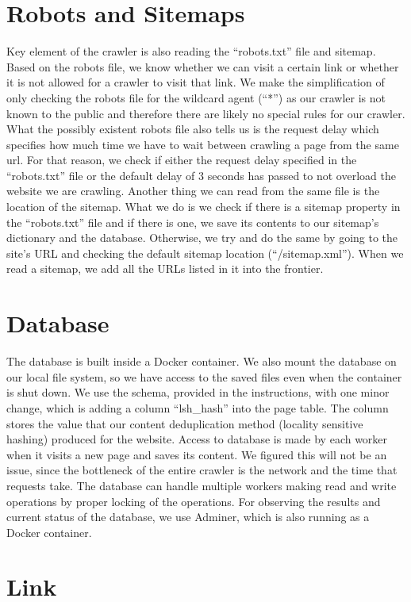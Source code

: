 \documentclass[9pt]{IEEEtran}
\begin{document}
\section{Robots and Sitemaps}\label{sec:robotsSitemaps}
Key element of the crawler is also reading the ``robots.txt'' file and sitemap. 
Based on the robots file, we know whether we can visit a certain link or whether it is not allowed for a crawler to visit that link.
We make the simplification of only checking the robots file for the wildcard agent (``*'') as our crawler is not known to the public and therefore there are likely no special rules for our crawler.
What the possibly existent robots file also tells us is the request delay which specifies how much time we have to wait between crawling a page from the same url.
For that reason, we check if either the request delay specified in the ``robots.txt'' file or the default delay of 3 seconds has passed to not overload the website we are crawling.
Another thing we can read from the same file is the location of the sitemap.
What we do is we check if there is a sitemap property in the ``robots.txt'' file and if there is one, we save its contents to our sitemap's dictionary and the database. Otherwise, we try and do the same by going to the site's URL and checking the default sitemap location (``/sitemap.xml'').
When we read a sitemap, we add all the URLs listed in it into the frontier. 


\section{Database}\label{sec:database}
The database is built inside a Docker container.
We also mount the database on our local file system, so we have access to the saved files even when the container is shut down.
We use the schema, provided in the instructions, with one minor change, which is adding a column ``lsh\_hash'' into the page table. 
The column stores the value that our content deduplication method (locality sensitive hashing) produced for the website. 
Access to database is made by each worker when it visits a new page and saves its content.
We figured this will not be an issue, since the bottleneck of the entire crawler is the network and the time that requests take.
The database can handle multiple workers making read and write operations by proper locking of the operations.
For observing the results and current status of the database, we use Adminer, which is also running as a Docker container.

\section{Link}\label{sec:Links}
\end{document}
